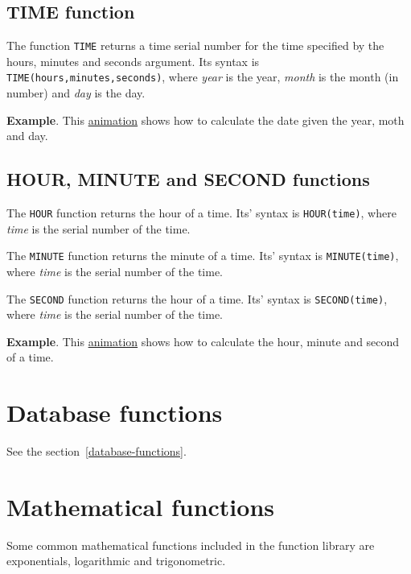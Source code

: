 \subsection{TIME function}\hypertarget{time-function}{}\label{time-function}

The function \texttt{TIME} returns a time serial number for the time specified by the hours, minutes and seconds argument. Its syntax is \texttt{TIME(hours,minutes,seconds)}, where \emph{year} is the year, \emph{month} is the month (in number) and \emph{day} is the day.

\textbf{Example}. This \href{http://aprendeconalf.es/office/excel/manual/img/example_function_time.gif}{animation} shows how to calculate the date given the year, moth and day.

\subsection{HOUR, MINUTE and SECOND functions}\hypertarget{hour-minute-and-second-functions}{}\label{hour-minute-and-second-functions}

The \texttt{HOUR} function returns the hour of a time. Its' syntax is \texttt{HOUR(time)}, where \emph{time} is the serial number of the time.

The \texttt{MINUTE} function returns the minute of a time. Its' syntax is \texttt{MINUTE(time)}, where \emph{time} is the serial number of the time.

The \texttt{SECOND} function returns the hour of a time. Its' syntax is \texttt{SECOND(time)}, where \emph{time} is the serial number of the time.

\textbf{Example}. This \href{http://aprendeconalf.es/office/excel/manual/img/example_function_hour.gif}{animation} shows how to calculate the hour, minute and second of a time.

\section{Database functions}

See the section~\ref{database-functions}.

\section{Mathematical functions}\hypertarget{mathematical-functions}{}\label{mathematical-functions}

Some common mathematical functions included in the function library are exponentials, logarithmic and trigonometric.

